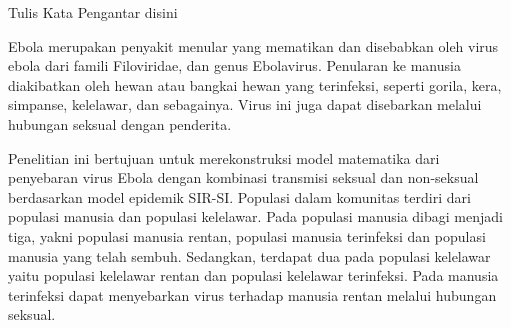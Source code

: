 \documentclass{SkripsiUnesa}
\begin{document}
	\linespread{1.15}



\Awal
\HalamanJudul
\SampulDalam
\HalamanPersetujuan
\HalamanPengesahan
\Orisinalitas
\newpage
\KataPengantar

Tulis Kata Pengantar disini

\begin{Abstrak}
	Ebola merupakan penyakit menular yang mematikan dan disebabkan oleh virus ebola dari famili Filoviridae, dan genus Ebolavirus. Penularan ke manusia diakibatkan oleh hewan atau bangkai hewan yang terinfeksi, seperti gorila, kera, simpanse, kelelawar, dan sebagainya. Virus ini juga dapat disebarkan melalui hubungan seksual dengan penderita.
	
	Penelitian ini bertujuan untuk merekonstruksi model matematika dari penyebaran virus Ebola dengan kombinasi transmisi seksual dan non-seksual berdasarkan model epidemik SIR-SI. Populasi dalam komunitas terdiri dari populasi manusia dan populasi kelelawar. Pada populasi manusia dibagi menjadi tiga, yakni populasi manusia rentan, populasi manusia terinfeksi dan populasi manusia yang telah sembuh. Sedangkan, terdapat dua pada populasi kelelawar yaitu populasi kelelawar rentan dan populasi kelelawar terinfeksi. Pada manusia terinfeksi dapat menyebarkan virus terhadap manusia rentan melalui hubungan seksual. 
\end{Abstrak}
\end{document}
